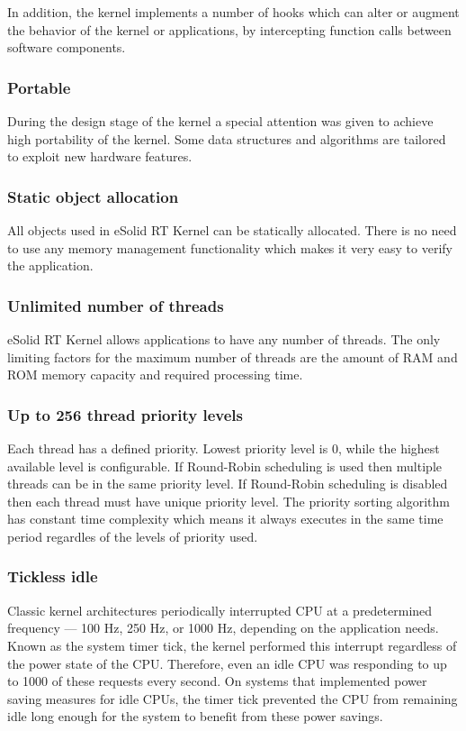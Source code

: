 In addition, the kernel implements a number of hooks which can alter or augment the behavior of the kernel or applications, by intercepting function calls between software components.\hypertarget{index_spec_portable}{}\subsubsection{Portable}\label{index_spec_portable}
During the design stage of the kernel a special attention was given to achieve high portability of the kernel. Some data structures and algorithms are tailored to exploit new hardware features.\hypertarget{index_spec_static}{}\subsubsection{Static object allocation}\label{index_spec_static}
All objects used in e\-Solid R\-T Kernel can be statically allocated. There is no need to use any memory management functionality which makes it very easy to verify the application.\hypertarget{index_spec_unlimited}{}\subsubsection{Unlimited number of threads}\label{index_spec_unlimited}
e\-Solid R\-T Kernel allows applications to have any number of threads. The only limiting factors for the maximum number of threads are the amount of R\-A\-M and R\-O\-M memory capacity and required processing time.\hypertarget{index_spec_prio}{}\subsubsection{Up to 256 thread priority levels}\label{index_spec_prio}
Each thread has a defined priority. Lowest priority level is 0, while the highest available level is configurable. If Round-\/\-Robin scheduling is used then multiple threads can be in the same priority level. If Round-\/\-Robin scheduling is disabled then each thread must have unique priority level. The priority sorting algorithm has constant time complexity which means it always executes in the same time period regardles of the levels of priority used.\hypertarget{index_spec_tickless}{}\subsubsection{Tickless idle}\label{index_spec_tickless}
Classic kernel architectures periodically interrupted C\-P\-U at a predetermined frequency — 100 Hz, 250 Hz, or 1000 Hz, depending on the application needs. Known as the system timer tick, the kernel performed this interrupt regardless of the power state of the C\-P\-U. Therefore, even an idle C\-P\-U was responding to up to 1000 of these requests every second. On systems that implemented power saving measures for idle C\-P\-Us, the timer tick prevented the C\-P\-U from remaining idle long enough for the system to benefit from these power savings.

